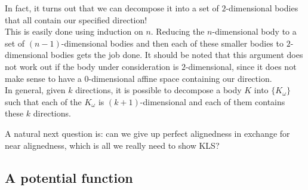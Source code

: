 \documentclass{article}
\begin{document}
		In fact, it turns out that we can decompose it into a set of $2$-dimensional bodies that all contain our specified direction!\\

		This is easily done using induction on $n$. Reducing the $n$-dimensional body to a set of $(n-1)$-dimensional bodies and then each of these smaller bodies to $2$-dimensional bodies gets the job done. It should be noted that this argument does not work out if the body under consideration is $2$-dimensional, since it does not make sense to have a $0$-dimensional affine space containing our direction.\\

		In general, given $k$ directions, it is possible to decompose a body $K$ into $\{K_\omega\}$ such that each of the $K_\omega$ is $(k+1)$-dimensional and each of them contains these $k$ directions.


		A natural next question is: can we give up perfect alignedness in exchange for near alignedness, which is all we really need to show KLS?

	\subsection{A potential function}
\end{document}
